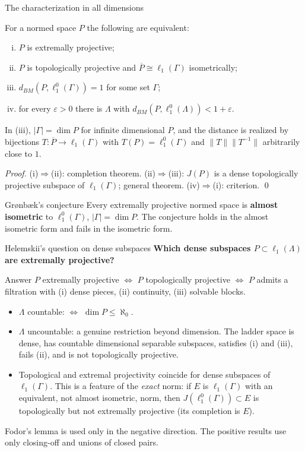 \documentclass[10pt,aspectratio=169]{beamer}
\newcommand{\lo}[1]{\ell_1^0(#1)}
\newcommand{\ellone}[1]{\ell_1(#1)}
\newcommand{\BM}{d_{BM}}
\begin{document}
\begin{frame}{The characterization in all dimensions}
  \begin{theorem}
    For a normed space $P$ the following are equivalent:
    \begin{enumerate}[(i)]
      \item $P$ is extremally projective;
      \item $P$ is topologically projective and $\overline P\cong\ellone\Gamma$ isometrically;
      \item $\BM(P,\lo\Gamma)=1$ for some set $\Gamma$;
      \item for every $\varepsilon>0$ there is $\Lambda$ with $\BM(P,\lo\Lambda)<1+\varepsilon$.
    \end{enumerate}
    In (iii), $|\Gamma|=\dim P$ for infinite dimensional $P$, and the distance is
    realized by bijections $T\colon\overline P\to\ellone\Gamma$ with $T(P)=\lo\Gamma$
    and $\|T\|\|T^{-1}\|$ arbitrarily close to $1$.
  \end{theorem}
  \textit{Proof.} (i)$\Rightarrow$(ii): completion theorem. (ii)$\Rightarrow$(iii):
  $J(P)$ is a dense topologically projective subspace of $\ellone\Gamma$; general
  theorem. (iv)$\Rightarrow$(i): criterion. \qed
  \begin{alertblock}{Gr{\o}nb{\ae}k's conjecture}
    Every extremally projective normed space is \textbf{almost isometric} to
    $\lo\Gamma$, $|\Gamma|=\dim P$. The conjecture holds in the almost isometric
    form and fails in the isometric form.
  \end{alertblock}
\end{frame}

\begin{frame}{Helemskii's question on dense subspaces}
  \textbf{Which dense subspaces $P\subset\ellone\Lambda$ are extremally projective?}
  \begin{block}{Answer}
    $P$ extremally projective $\iff$ $P$ topologically projective $\iff$ $P$ admits
    a filtration with (i) dense pieces, (ii) continuity, (iii) solvable blocks.
  \end{block}
  \begin{itemize}
    \item $\Lambda$ countable: $\iff$ $\dim P\le\aleph_0$.
    \item $\Lambda$ uncountable: a genuine restriction beyond dimension. The ladder
      space is dense, has countable dimensional separable subspaces, satisfies
      (i) and (iii), fails (ii), and is not topologically projective.
    \item Topological and extremal projectivity coincide for dense subspaces of
      $\ellone\Gamma$. This is a feature of the \emph{exact} norm: if $E$ is
      $\ellone\Gamma$ with an equivalent, not almost isometric, norm, then
      $J(\lo\Gamma)\subset E$ is topologically but not extremally projective
      (its completion is $E$).
  \end{itemize}
  \medskip
  Fodor's lemma is used only in the negative direction. The positive results use
  only closing-off and unions of closed pairs.
\end{frame}
\end{document}
